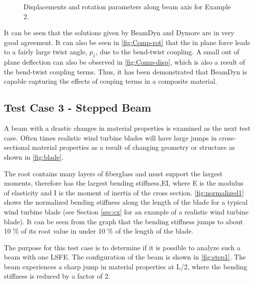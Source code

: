 \documentclass[letterpaper,12pt]{article}
\begin{document}
\begin{figure}
	\begin{center}
		\caption{\label{fig:7}Displacements and rotation parameters along beam axis for Example 2.}
	\end{center}
\end{figure}

It can be seen that the solutions given by BeamDyn and Dymore are in very good agreement. It can also be seen in \ref{fig:Comp-rot} that the in plane force leads to a fairly large twist angle, $p_1$, due to the bend-twist coupling. A small out of plane deflection can also be observed in \ref{fig:Comp-disp}, which is  also a result of the bend-twist coupling terms.  Thus, it has been demonstrated that BeamDyn is capable capturing the effects of couping terms in a composite material.

\newpage

\subsection{Test Case 3 - Stepped Beam}
\label{sec:step}
A beam with a drastic changes in material properties is examined as the next test case. Often times realistic wind turbine blades will have large jumps in cross-sectional material properties as a result of changing geometry or structure as shown in \ref{fig:blade}. 


The root contains many layers of fiberglass and must support the largest moments, therefore has the largest bending stiffness,EI, where E is the modulus of elasticity and I is the moment of inertia of the cross section. \ref{fig:normalized1} shows the normalized bending stiffness along the length of the blade for a typical wind turbine blade (see Section \ref{sec:cx} for an example of a realistic wind turbine blade). It can be seen from the graph that the bending stiffness jumps to about 10 \% of its root value in under 10 \% of the length of the blade. 


The purpose for this test case is to determine if it is possible to analyze such a beam with one LSFE. The configuration of the beam is shown in \ref{fig:step1}. The beam experiences a sharp jump in material properties at L/2, where the bending stiffness is reduced by a factor of 2. 
\end{document}
